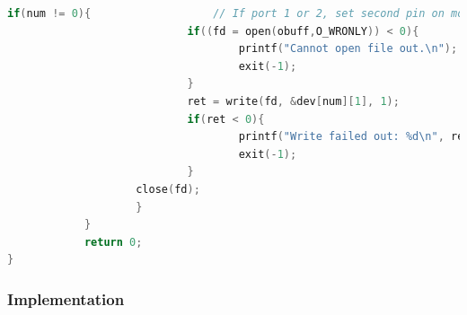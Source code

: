 \begin{lstlisting}[language=c, caption=User space application to control the Power switches]
                	if(num != 0){					// If port 1 or 2, set second pin on module
                        	if((fd = open(obuff,O_WRONLY)) < 0){
                                	printf("Cannot open file out.\n");
                                	exit(-1);
                        	}
                        	ret = write(fd, &dev[num][1], 1);
                        	if(ret < 0){
                                	printf("Write failed out: %d\n", ret);
                                	exit(-1);
                        	}
                	close(fd);
                	}
        	}
        	return 0;
}
\end{lstlisting}


%
%
\subsubsection{Implementation}

